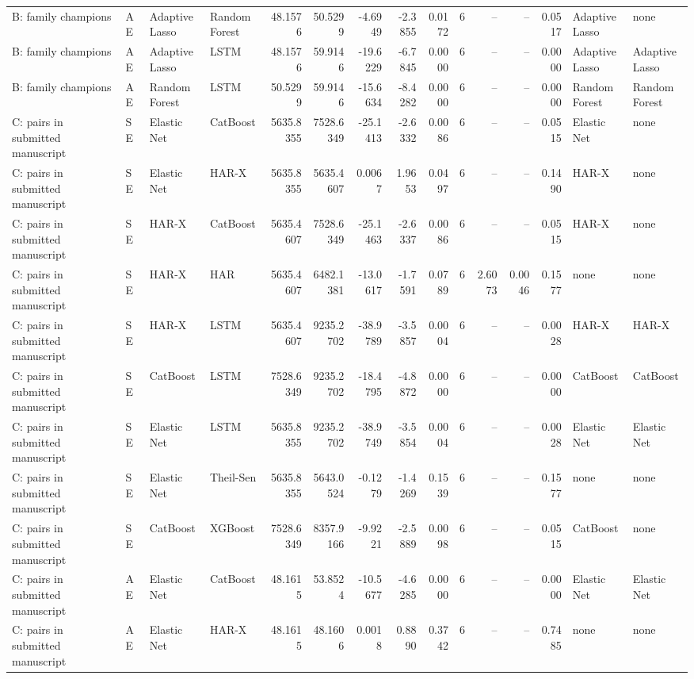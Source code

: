 \begin{table}[htbp]
{\begin{tabular}{llllrrrrrrrrrll}
B: family champions & AE & Adaptive Lasso & Random Forest & 48.1576 & 50.5299 & -4.6949 & -2.3855 & 0.0172 & 6 & -- & -- & 0.0517 & Adaptive Lasso & none \\
B: family champions & AE & Adaptive Lasso & LSTM & 48.1576 & 59.9146 & -19.6229 & -6.7845 & 0.0000 & 6 & -- & -- & 0.0000 & Adaptive Lasso & Adaptive Lasso \\
B: family champions & AE & Random Forest & LSTM & 50.5299 & 59.9146 & -15.6634 & -8.4282 & 0.0000 & 6 & -- & -- & 0.0000 & Random Forest & Random Forest \\
C: pairs in submitted manuscript & SE & Elastic Net & CatBoost & 5635.8355 & 7528.6349 & -25.1413 & -2.6332 & 0.0086 & 6 & -- & -- & 0.0515 & Elastic Net & none \\
C: pairs in submitted manuscript & SE & Elastic Net & HAR-X & 5635.8355 & 5635.4607 & 0.0067 & 1.9653 & 0.0497 & 6 & -- & -- & 0.1490 & HAR-X & none \\
C: pairs in submitted manuscript & SE & HAR-X & CatBoost & 5635.4607 & 7528.6349 & -25.1463 & -2.6337 & 0.0086 & 6 & -- & -- & 0.0515 & HAR-X & none \\
C: pairs in submitted manuscript & SE & HAR-X & HAR & 5635.4607 & 6482.1381 & -13.0617 & -1.7591 & 0.0789 & 6 & 2.6073 & 0.0046 & 0.1577 & none & none \\
C: pairs in submitted manuscript & SE & HAR-X & LSTM & 5635.4607 & 9235.2702 & -38.9789 & -3.5857 & 0.0004 & 6 & -- & -- & 0.0028 & HAR-X & HAR-X \\
C: pairs in submitted manuscript & SE & CatBoost & LSTM & 7528.6349 & 9235.2702 & -18.4795 & -4.8872 & 0.0000 & 6 & -- & -- & 0.0000 & CatBoost & CatBoost \\
C: pairs in submitted manuscript & SE & Elastic Net & LSTM & 5635.8355 & 9235.2702 & -38.9749 & -3.5854 & 0.0004 & 6 & -- & -- & 0.0028 & Elastic Net & Elastic Net \\
C: pairs in submitted manuscript & SE & Elastic Net & Theil-Sen & 5635.8355 & 5643.0524 & -0.1279 & -1.4269 & 0.1539 & 6 & -- & -- & 0.1577 & none & none \\
C: pairs in submitted manuscript & SE & CatBoost & XGBoost & 7528.6349 & 8357.9166 & -9.9221 & -2.5889 & 0.0098 & 6 & -- & -- & 0.0515 & CatBoost & none \\
C: pairs in submitted manuscript & AE & Elastic Net & CatBoost & 48.1615 & 53.8524 & -10.5677 & -4.6285 & 0.0000 & 6 & -- & -- & 0.0000 & Elastic Net & Elastic Net \\
C: pairs in submitted manuscript & AE & Elastic Net & HAR-X & 48.1615 & 48.1606 & 0.0018 & 0.8890 & 0.3742 & 6 & -- & -- & 0.7485 & none & none \\

\end{tabular}}
\end{table}
